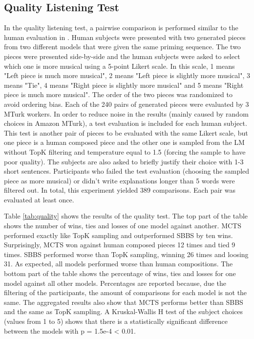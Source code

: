 \subsection{Quality Listening Test}

In the quality listening test, a pairwise comparison is performed similar to the human evaluation in \cite{huang2018music}. Human subjects were presented with two generated pieces from two different models that were given the same priming sequence. The two pieces were presented side-by-side and the human subjects were asked to select which one is more musical using a 5-point Likert scale. In this scale, 1 means "Left piece is much more musical", 2 means "Left piece is slightly more musical", 3 means "Tie", 4 means "Right piece is slightly more musical" and 5 means "Right piece is much more musical". The order of the two pieces was randomized to avoid ordering bias. Each of the 240 pairs of generated pieces were evaluated by 3 MTurk workers. In order to reduce noise in the results (mainly caused by random choices in Amazon MTurk), a test evaluation is included for each human subject. This test is another pair of pieces to be evaluated with the same Likert scale, but one piece is a human composed piece and the other one is sampled from the LM without TopK filtering and temperature equal to 1.5 (forcing the sample to have poor quality). The subjects are also asked to briefly justify their choice with 1-3 short sentences. Participants who failed the test evaluation (choosing the sampled piece as more musical) or didn't write explanations longer than 5 words were filtered out. In total, this experiment yielded 389 comparisons. Each pair was evaluated at least once.

Table \ref{tab:quality} shows the results of the quality test. The top part of the table shows the number of wins, ties and losses of one model against another.  MCTS performed exactly like TopK sampling and outperformed SBBS by ten wins. Surprisingly, MCTS won against human composed pieces 12 times and tied 9 times. SBBS performed worse than TopK sampling, winning 26 times and loosing 31. As expected, all models performed worse than human compositions. The bottom part of the table shows the percentage of wins, ties and losses for one model against all other models. Percentages are reported because, due the filtering of the participants, the amount of comparisons for each model is not the same. The aggregated results also show that MCTS performs better than SBBS and the same as TopK sampling. A Kruskal-Wallis H test of the subject choices (values from 1 to 5) shows that there is a statistically significant difference between the models with p = 1.5e-4 < 0.01.

